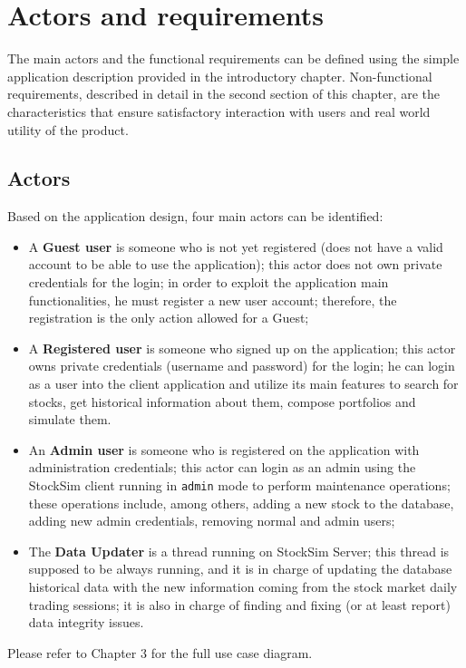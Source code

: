 \chapter{Actors and requirements}
The main actors and the functional requirements can be defined using the simple
application description provided in the introductory chapter. Non-functional
requirements, described in detail in the second section of this chapter, are the
characteristics that ensure satisfactory interaction with users and real world
utility of the product.
\section{Actors}
Based on the application design, four main actors can be identified:
\begin{itemize}
    \item A \textbf{Guest user} is someone who is not yet registered (does not
    have a valid account to be able to use the application); this actor does not
    own private credentials for the login; in order to exploit the application
    main functionalities, he must register a new user account; therefore, the
    registration is the only action allowed for a Guest;
    \item A \textbf{Registered user} is someone who signed up on the application;
    this actor owns private credentials (username and password) for the login;
    he can login as a user into the client application and utilize its main
    features to search for stocks, get historical information about them,
    compose portfolios and simulate them.
    \item An \textbf{Admin user} is someone who is registered on the application
    with administration credentials; this actor can login as an admin using the
    StockSim client running in \texttt{admin} mode to perform maintenance
    operations; these operations include, among others, adding a new stock to
    the database, adding new admin credentials, removing normal and admin users;
    \item The \textbf{Data Updater} is a thread running on StockSim Server; this 
    thread is supposed to be always running, and it is in charge of updating the
    database historical data with the new information coming from the stock
    market daily trading sessions; it is also in charge of finding and fixing
    (or at least report) data integrity issues.
\end{itemize}
Please refer to Chapter 3 for the full use case diagram.

